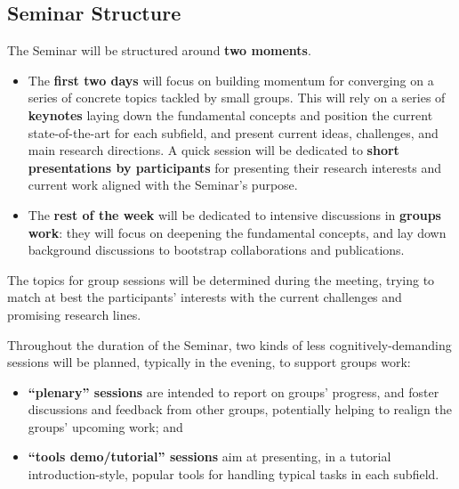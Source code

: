 \subsection{Seminar Structure}
\label{sec:Structure}


The Seminar will be structured around \textbf{two moments}. 
\begin{itemize}
	\item The \textbf{first two days} will focus on building momentum for converging 
	on a series of concrete topics tackled by small groups. This will rely on 
	a series of \textbf{keynotes} laying down the fundamental concepts and position
	the current state-of-the-art for each subfield, and present current ideas, 
	challenges, and main research directions. A quick session will be dedicated to
	\textbf{short presentations by participants} for presenting their research
	interests and current work aligned with the Seminar's purpose. 

	\item The \textbf{rest of the week} will be dedicated to intensive discussions
	in \textbf{groups work}: they will focus on deepening the fundamental concepts, 
	and lay down background discussions to bootstrap collaborations and publications.
\end{itemize}
The topics for group sessions will be determined during the meeting, trying to match
at best the participants' interests with the current challenges and promising 
research lines. 

Throughout the duration of the Seminar, two kinds of less cognitively-demanding 
sessions will be planned, typically in the evening, to support groups work:
\begin{itemize}
	\item \textbf{``plenary'' sessions} are intended to report on groups' progress, and 
	foster discussions and feedback from other groups, potentially helping to realign 
	the groups' upcoming work; and 
	\item \textbf{``tools demo/tutorial'' sessions} aim at presenting, in a tutorial 
	introduction-style, popular tools for handling typical tasks in each subfield.
\end{itemize}
